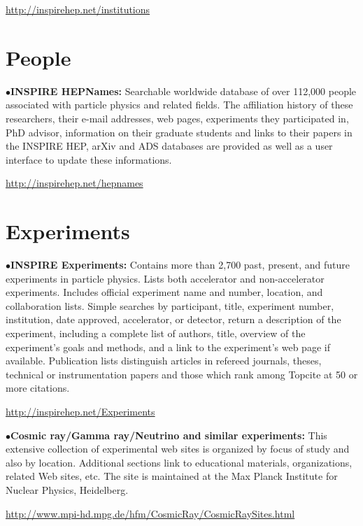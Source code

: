 	\item{}\qquad\url{http://inspirehep.net/institutions}
\medskip


\section{People} %


\item{$\bullet$}{\bf INSPIRE HEPNames:} 
Searchable worldwide database of over 112,000 people associated with particle physics and related fields. The affiliation history of these researchers, their e-mail addresses, web pages, experiments they participated in, PhD advisor, information on their graduate students and links to their papers in the INSPIRE HEP, arXiv and ADS databases are provided as well as a user interface to update these informations.

	\item{}\qquad\url{http://inspirehep.net/hepnames}

\medskip


\section{Experiments}  %

\item{$\bullet$}{\bf INSPIRE Experiments:} 
Contains more than 2,700 past, present, and future experiments in particle physics. Lists both accelerator and non-accelerator experiments. Includes official experiment name and number, location, and collaboration lists. Simple searches by participant, title, experiment number, institution, date approved, accelerator, or detector, return a description of the experiment, including a complete list of authors, title, overview of the experiment's goals and methods, and a link to the experiment's web page if available. Publication lists distinguish articles in refereed journals, theses, technical or instrumentation papers and those which rank among Topcite at 50 or more citations.
 
	\item{}\qquad\url{http://inspirehep.net/Experiments}

\medskip

\item{$\bullet$}{\bf Cosmic ray/Gamma ray/Neutrino and similar experiments:} 
This extensive collection of experimental web sites is organized by focus of study and also by location. Additional sections link to educational materials, organizations, related Web sites, etc. The site is maintained at the Max Planck Institute for Nuclear Physics, Heidelberg.
	\item{}\qquad\url{http://www.mpi-hd.mpg.de/hfm/CosmicRay/CosmicRaySites.html}

